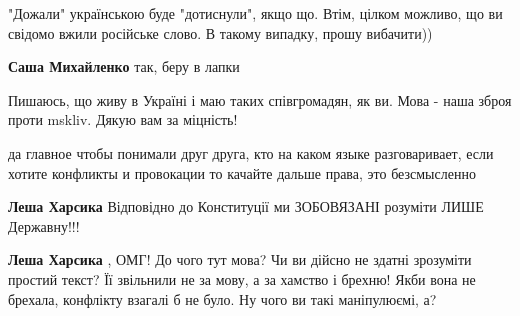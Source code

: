 \begin{itemize}
\begin{itemize}
"Дожали" українською буде "дотиснули", якщо що. Втім, цілком можливо, що ви свідомо вжили російське слово. В такому випадку, прошу вибачити))

 
\textbf{Саша Михайленко} так, беру в лапки
\end{itemize}

 
Пишаюсь, що живу в Україні і маю таких співгромадян, як ви. Мова - наша зброя
проти mskliv. Дякую вам за міцність!

 

да главное чтобы понимали друг друга, кто на каком языке разговаривает, если
хотите конфликты и провокации то качайте дальше права, это безсмысленно

\begin{itemize}
 
\textbf{Леша Харсика} Відповідно до Конституції ми ЗОБОВЯЗАНІ розуміти ЛИШЕ Державну!!!

 
\textbf{Леша Харсика} , ОМГ! До чого тут мова? Чи ви дійсно не здатні зрозуміти простий текст? Її звільнили не за мову, а за хамство і брехню! Якби вона не брехала, конфлікту взагалі б не було. Ну чого ви такі маніпулюємі, а?


\end{itemize}
\end{itemize}
